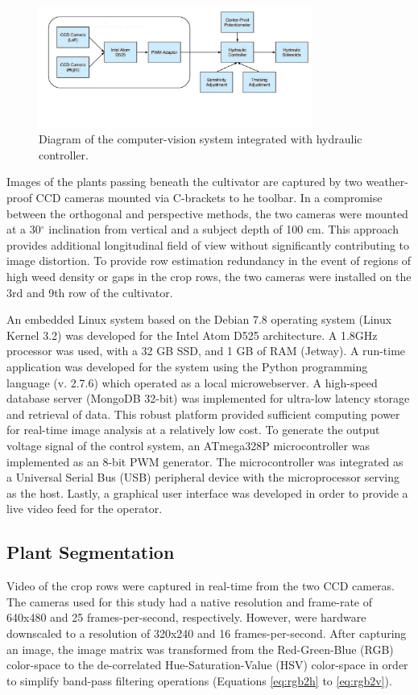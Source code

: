 \documentclass[authoryear]{elsarticle}
\begin{document}
\begin{figure}
  \centering
  \includegraphics[width=0.8\textwidth,natwidth=610,natheight=642]{agcv_diagram.png}
  \caption{Diagram of the computer-vision system integrated with hydraulic controller.}
\end{figure}

Images of the plants passing beneath the cultivator are captured by
two weather-proof CCD cameras mounted via C-brackets to he toolbar. 
In a compromise between the orthogonal and perspective
methods, the two cameras were mounted at a 30$^{\circ}$ inclination from
vertical and a subject depth of 100 cm. This approach provides
additional longitudinal field of view without significantly
contributing to image distortion. To provide row estimation redundancy
in the event of regions of high weed density or gaps in the crop rows,
the two cameras were installed on the 3rd and 9th row of the
cultivator.

An embedded Linux system based on the Debian 7.8 operating system
(Linux Kernel 3.2) was developed for the Intel Atom D525
architecture. A 1.8GHz processor was used, with a 32 GB SSD, and 1 GB
of RAM (Jetway). A run-time application was developed for the system
using the Python programming language (v. 2.7.6) which operated as a
local microwebserver. A high-speed database server (MongoDB 32-bit)
was implemented for ultra-low latency storage and retrieval of
data. This robust platform provided sufficient computing power for
real-time image analysis at a relatively low cost. To generate the
output voltage signal of the control system, an
ATmega328P microcontroller was implemented as an 8-bit PWM generator. The
microcontroller was integrated as a Universal Serial Bus (USB)
peripheral device with the microprocessor serving as the
host. Lastly, a graphical user interface was developed in order to provide a
live video feed for the operator.

\subsection{Plant Segmentation}
Video of the crop rows were captured in real-time from the two CCD
cameras. The cameras used for this study had a native resolution and
frame-rate of 640x480 and 25 frames-per-second, respectively. However,
were hardware downscaled to a resolution of 320x240 and 16
frames-per-second. After capturing an image, the image matrix was
transformed from the Red-Green-Blue (RGB) color-space to the
de-correlated Hue-Saturation-Value (HSV) color-space in order to
simplify band-pass filtering operations (Equations \ref{eq:rgb2h} to \ref{eq:rgb2v}).
\end{document}
